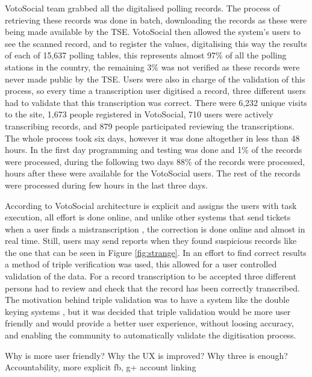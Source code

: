 \documentclass[letterpaper,10pt]{article}
\begin{document}
VotoSocial team grabbed all the digitalised polling records. The process of retrieving these records was done in batch, downloading the records as these were being made available by the TSE. VotoSocial then allowed the system's users to see the scanned record, and to register the values, digitalising this way the results of each of 15,637 polling tables, this represents almost 97\% of all the polling stations in the country, the remaining 3\% was not verified as these records were never made public by the TSE. Users were also in charge of the validation of this process, so every time a transcription user digitised a record, three different users had to validate that this transcription was correct. There were 6,232 unique visits to the site, 1,673 people registered in VotoSocial, 710 users were actively transcribing records, and 879 people participated reviewing the transcriptions. The whole process took six days, however it was done altogether in less than 48 hours. In the first day programming and testing was done and 1\% of the records were processed, during the following two days 88\% of the records were processed, hours after these were available for the VotoSocial users. The rest of the records were processed during few hours in the last three days.

According to \cite{doan2011} VotoSocial architecture is explicit and assigns the users with task execution, all effort is done online, and unlike other systems that send tickets when a user finds a mistranscription \citep{haaf2013}, the correction is done online and almost in real time. Still, users may send reports when they found suspicious records like the one that can be seen in Figure \ref{fig:strange}. In an effort to find correct results a method of triple verification was used, this allowed for a user controlled validation of the data. For a record transcription to be accepted three different persons had to review and check that the record has been correctly transcribed. The motivation behind triple validation was to have a system like the double keying systems \citep{haaf2013}, but it was decided that triple validation would be more user friendly and would provide a better user experience, without loosing accuracy, and enabling the community to automatically validate the digitisation process. 

Why is more user friendly?
Why the UX is improved?
Why three is enough?
Accountability, more explicit fb, g+ account linking
\end{document}
